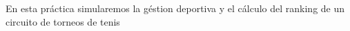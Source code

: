 En esta práctica simularemos la géstion deportiva y el cálculo del ranking de un circuito de torneos de tenis 
